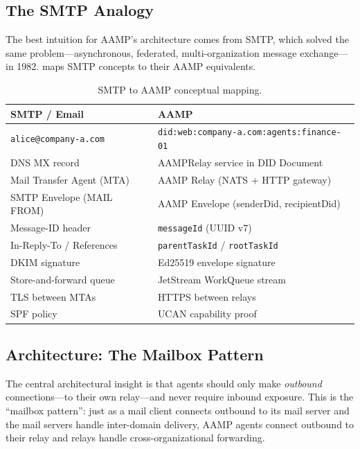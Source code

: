 \documentclass[11pt,a4paper]{article}
\begin{document}
\subsection{The SMTP Analogy}
\label{sec:smtp}

The best intuition for AAMP's architecture comes from SMTP, which solved the same
problem---asynchronous, federated, multi-organization message exchange---in 1982.
 maps SMTP concepts to their AAMP equivalents.

\begin{table}[H]
\centering
\caption{SMTP to AAMP conceptual mapping.}
\label{tab:smtp}
\small
\begin{tabular}{ll}
\toprule
\textbf{SMTP / Email}       & \textbf{AAMP}                         \\
\midrule
\texttt{alice@company-a.com} & \texttt{did:web:company-a.com:agents:finance-01} \\
DNS MX record               & AAMPRelay service in DID Document     \\
Mail Transfer Agent (MTA)   & AAMP Relay (NATS + HTTP gateway)      \\
SMTP Envelope (MAIL FROM)   & AAMP Envelope (senderDid, recipientDid) \\
Message-ID header           & \texttt{messageId} (UUID v7)           \\
In-Reply-To / References    & \texttt{parentTaskId} / \texttt{rootTaskId} \\
DKIM signature              & Ed25519 envelope signature            \\
Store-and-forward queue     & JetStream WorkQueue stream            \\
TLS between MTAs            & HTTPS between relays                  \\
SPF policy                  & UCAN capability proof                 \\
\bottomrule
\end{tabular}
\end{table}

\subsection{Architecture: The Mailbox Pattern}
\label{sec:mailbox}

The central architectural insight is that agents should only make \emph{outbound}
connections---to their own relay---and never require inbound exposure. This is the
``mailbox pattern'': just as a mail client connects outbound to its mail server and the
mail servers handle inter-domain delivery, AAMP agents connect outbound to their relay
and relays handle cross-organizational forwarding.
\end{document}
